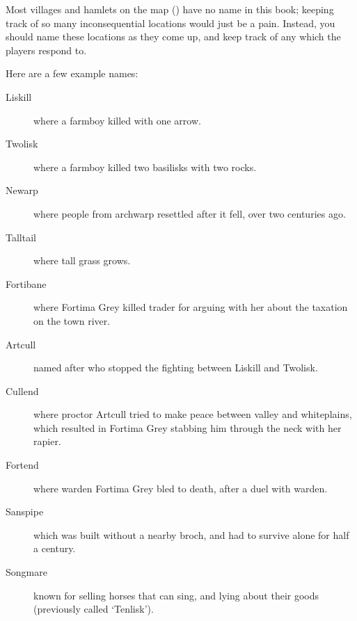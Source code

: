 \begin{multicols}{2}

\noindent
Most \glspl{village} and hamlets on the map () have no name in this book; keeping track of so many inconsequential locations would just be a pain.
Instead, you should name these locations as they come up, and keep track of any which the players respond to.

Here are a few example names:

\begin{description}
	\item[Liskill]
  where a farmboy killed  with one arrow.
	\item[Twolisk]
  where a farmboy killed two \glspl{basilisk} with two rocks.
	\item[Newarp]
  where people from \gls{archwarp} resettled after it fell, over two centuries ago.
	\item[Talltail]
  where tall grass grows.
	\item[Fortibane]
  where Fortima Grey killed  trader for arguing with her about the taxation on the \gls{town} river.
	\item[Artcull]
  named after  who stopped the fighting between Liskill and Twolisk.
	\item[Cullend]
  where \Gls{proctor} Artcull tried to make peace between \gls{valley} and \gls{whiteplains}, which resulted in Fortima Grey stabbing him through the neck with her rapier.
	\item[Fortend]
  where \Gls{warden} Fortima Grey bled to death, after a duel with  \gls{warden}.
	\item[Sanspipe]
  which was built without a nearby \gls{broch}, and had to survive alone for half a century.
	\item[Songmare]
  known for selling horses that can sing, and lying about their goods (previously called `Tenlisk').
\end{description}

\end{multicols}
